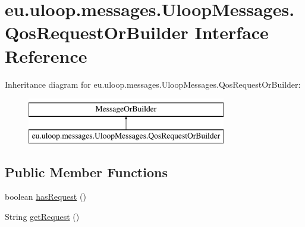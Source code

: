\hypertarget{interfaceeu_1_1uloop_1_1messages_1_1UloopMessages_1_1QosRequestOrBuilder}{\section{eu.\+uloop.\+messages.\+Uloop\+Messages.\+Qos\+Request\+Or\+Builder Interface Reference}
\label{interfaceeu_1_1uloop_1_1messages_1_1UloopMessages_1_1QosRequestOrBuilder}
}
Inheritance diagram for eu.\+uloop.\+messages.\+Uloop\+Messages.\+Qos\+Request\+Or\+Builder\+:\begin{figure}[H]
\begin{center}
\leavevmode
\includegraphics[height=2.000000cm]{interfaceeu_1_1uloop_1_1messages_1_1UloopMessages_1_1QosRequestOrBuilder}
\end{center}
\end{figure}
\subsection*{Public Member Functions}
\begin{DoxyCompactItemize}
\item 
boolean \hyperlink{interfaceeu_1_1uloop_1_1messages_1_1UloopMessages_1_1QosRequestOrBuilder_a236f0e4de792b3ca6abe00e92be133b6}{has\+Request} ()
\item 
String \hyperlink{interfaceeu_1_1uloop_1_1messages_1_1UloopMessages_1_1QosRequestOrBuilder_a208aa64ba9ab3d09f588527485bec93b}{get\+Request} ()
\end{DoxyCompactItemize}


